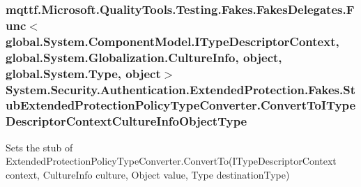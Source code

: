 \hypertarget{class_system_1_1_security_1_1_authentication_1_1_extended_protection_1_1_fakes_1_1_stub_extendedf67afed15bbc0df07bfc91316f6f81f0_ac49540b970495af47fcd11fb70fee8f4}{
\subsubsection[{Convert\-To\-I\-Type\-Descriptor\-Context\-Culture\-Info\-Object\-Type}]{\setlength{\rightskip}{0pt plus 5cm}mqttf.\-Microsoft.\-Quality\-Tools.\-Testing.\-Fakes.\-Fakes\-Delegates.\-Func$<$global.\-System.\-Component\-Model.\-I\-Type\-Descriptor\-Context, global.\-System.\-Globalization.\-Culture\-Info, object, global.\-System.\-Type, object$>$ System.\-Security.\-Authentication.\-Extended\-Protection.\-Fakes.\-Stub\-Extended\-Protection\-Policy\-Type\-Converter.\-Convert\-To\-I\-Type\-Descriptor\-Context\-Culture\-Info\-Object\-Type}}\label{class_system_1_1_security_1_1_authentication_1_1_extended_protection_1_1_fakes_1_1_stub_extendedf67afed15bbc0df07bfc91316f6f81f0_ac49540b970495af47fcd11fb70fee8f4}


Sets the stub of Extended\-Protection\-Policy\-Type\-Converter.\-Convert\-To(\-I\-Type\-Descriptor\-Context context, Culture\-Info culture, Object value, Type destination\-Type)

